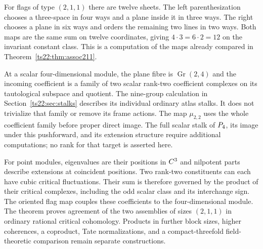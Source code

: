 For flags of type $(2,1,1)$ there are twelve sheets. The left
parenthesization chooses a three-space in four ways and a plane
inside it in three ways. The right chooses a plane in six ways
and orders the remaining two lines in two ways. Both maps are the
same sum on twelve coordinates, giving $4\cdot3=6\cdot2=12$ on
the invariant constant class. This is a computation of the maps
already compared in Theorem~\ref{ts22:thm:assoc211}.

At a scalar four-dimensional module, the plane fibre is
$\operatorname{Gr}(2,4)$ and the incoming coefficient is a family
of two scalar rank-two coefficient complexes on its tautological
subspace and quotient. The nine-group calculation in
Section~\ref{ts22:sec:stalks} describes its individual ordinary atlas
stalks. It does not trivialize that family or remove its frame
actions. The map $\mu_{2,2}$ uses the whole coefficient family
before proper direct image. The full scalar stalk of $P_4$, its
image under this pushforward, and its extension structure require
additional computations; no rank for that target is asserted here.

For point modules, eigenvalues are their positions in $C^3$ and
nilpotent parts describe extensions at coincident positions. Two
rank-two constituents can each have cubic critical fluctuations.
Their sum is therefore governed by the product of their critical
complexes, including the odd scalar class and its interchange sign.
The oriented flag map couples these coefficients to the four-dimensional
module. The theorem proves agreement of the two assemblies of
sizes $(2,1,1)$ in ordinary rational critical cohomology. Products
in further block sizes, higher coherences, a coproduct, Tate
normalizations, and a compact-threefold field-theoretic comparison
remain separate constructions.
